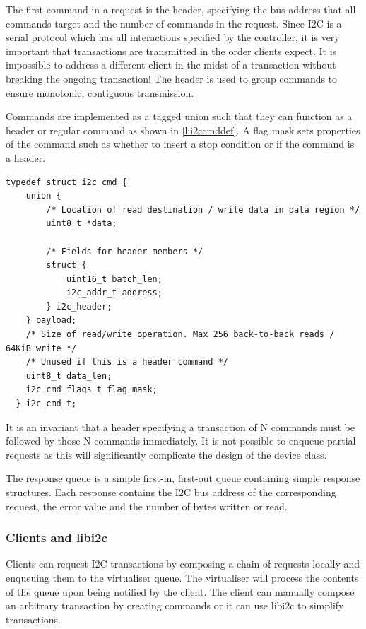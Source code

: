 \documentclass[a4paper,12pt]{report}
\begin{document}
The first command in a request is the header, specifying the bus address that all
commands target and the number of commands in the request. Since I2C is a serial
protocol which has all interactions specified by the controller, it is very important
that transactions are transmitted in the order clients expect. It is impossible to
address a different client in the midst of a transaction without breaking the ongoing
transaction! The header is used to group commands to ensure monotonic, contiguous
transmission.

Commands are implemented as a tagged union such that they can function as a header or
regular command as shown in \autoref{l:i2ccmddef}. A flag mask sets properties of
the command such as whether to insert a stop condition or if the command is a header.

\begin{lstlisting}[gobble=2,firstline=2,float=th,
  label={l:i2ccmddef},
  caption={I2C command structure.}]
  typedef struct i2c_cmd {
    union {
        /* Location of read destination / write data in data region */
        uint8_t *data;

        /* Fields for header members */
        struct {
            uint16_t batch_len;
            i2c_addr_t address;
        } i2c_header;
    } payload;
    /* Size of read/write operation. Max 256 back-to-back reads / 64KiB write */
    /* Unused if this is a header command */
    uint8_t data_len;
    i2c_cmd_flags_t flag_mask;
  } i2c_cmd_t;
\end{lstlisting}

It is an invariant that a header specifying a transaction of N commands must be followed
by those N commands immediately. It is not possible to enqueue partial requests as this
will significantly complicate the design of the device class.

The response queue is a simple first-in, first-out queue containing simple response
structures. Each response contains the I2C bus address of the corresponding request,
the error value and the number of bytes written or read.


\subsubsection{Clients and libi2c}

Clients can request I2C transactions by composing a chain of requests locally and enqueuing
them to the virtualiser queue. The virtualiser will process the contents of the queue upon
being notified by the client. The client can manually compose an arbitrary transaction by
creating commands or it can use libi2c to simplify transactions.
\end{document}
